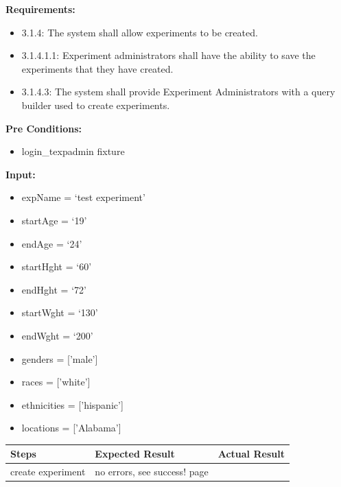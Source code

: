 \documentclass[letterpaper,10pt,english]{sphinxmanual}
\begin{document}
\begin{fulllineitems}
\label{STD/test_experiment:test_experiment.test_create_experiment}
\textbf{Requirements:}
\begin{itemize}
\item {} 
3.1.4: The system shall allow experiments to be created.

\item {} 
3.1.4.1.1: Experiment administrators shall have the ability to save the experiments that they have created.

\item {} 
3.1.4.3: The system shall provide Experiment Administrators with a query builder used to create experiments.

\end{itemize}

\textbf{Pre Conditions:}
\begin{itemize}
\item {} 
login\_texpadmin fixture

\end{itemize}

\textbf{Input:}
\begin{itemize}
\item {} 
expName = `test experiment'

\item {} 
startAge = `19'

\item {} 
endAge = `24'

\item {} 
startHght = `60'

\item {} 
endHght = `72'

\item {} 
startWght = `130'

\item {} 
endWght = `200'

\item {} 
genders = {[}'male'{]}

\item {} 
races = {[}'white'{]}

\item {} 
ethnicities = {[}'hispanic'{]}

\item {} 
locations = {[}'Alabama'{]}

\end{itemize}

\begin{tabulary}{\linewidth}{|L|L|L|}
\hline
\textsf{\relax 
Steps
} & \textsf{\relax 
Expected Result
} & \textsf{\relax 
Actual Result
}\\
\hline
create experiment
 & 
no errors, see success! page
 & \\
\hline\end{tabulary}


\end{fulllineitems}
\end{document}
